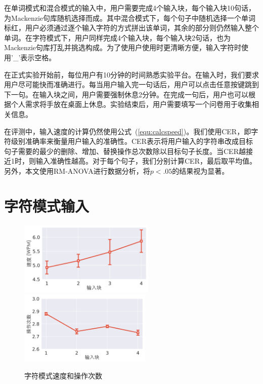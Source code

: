在单词模式和混合模式的输入中，用户需要完成4个输入块，每个输入块10句话，为Mackenzie句库随机选择而成\cite{mackenzie2003phrase}。其中混合模式下，每个句子中随机选择一个单词标红，用户必须通过逐个输入字符的方式拼出该单词，其余的部分则仍然输入整个单词。在字符模式下，用户同样完成4个输入块，每个输入块2句话，也为Mackenzie句库\cite{mackenzie2003phrase}打乱并挑选构成。为了使用户使用时更清晰方便，输入字符时使用'\_'表示空格。

在正式实验开始前，每位用户有10分钟的时间熟悉实验平台。在输入时，我们要求用户尽可能快而准确进行。每当用户输入完一句话后，用户可以点击任意按键跳到下一句。在输入块之间，用户需要强制休息2分钟。在完成一句后，用户也可以根据个人需求将手放在桌面上休息。实验结束后，用户需要填写一个问卷用于收集相关信息。

在评测中，输入速度的计算仍然使用公式~(\ref{equ:calcspeed})。我们使用CER\cite{cer}，即字符级别准确率来衡量用户输入的准确性。CER表示将用户输入的字符串改成目标句子需要的最少的删除、增加、替换操作总次数除以目标句子长度。当CER越接近1时，则输入准确性越高。对于每个句子，我们分别计算CER，最后取平均值。另外，本文使用RM-ANOVA进行数据分析，将$p<.05$的结果视为显著。

\section{字符模式输入}

\begin{figure}[h]
  \centering%
    {\includegraphics[height=3.5cm]{figures/charspeed.png}}%
  \hspace{4em}%
      {\includegraphics[height=3.5cm]{figures/ops.png}}
  \caption{字符模式速度和操作次数}
  \label{fig:charres}
\end{figure}

